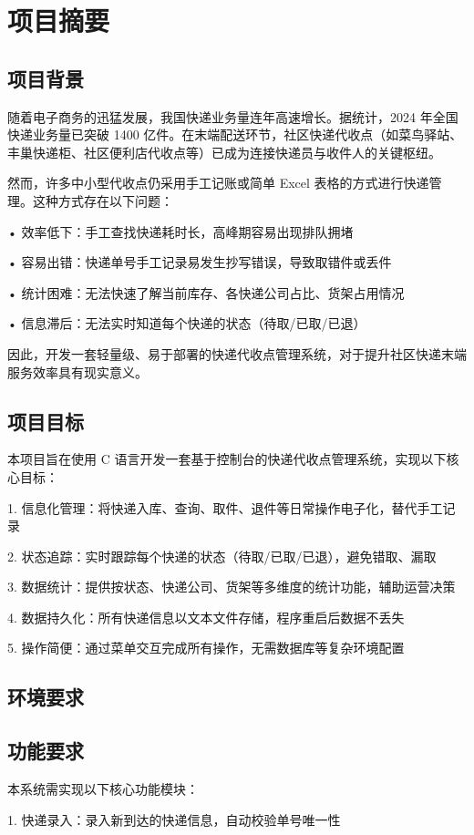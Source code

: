 \section{项目摘要}
\subsection{项目背景}
随着电子商务的迅猛发展，我国快递业务量连年高速增长。据统计，2024 年全国快递业务量已突破 1400 亿件。在末端配送环节，社区快递代收点（如菜鸟驿站、丰巢快递柜、社区便利店代收点等）已成为连接快递员与收件人的关键枢纽。

然而，许多中小型代收点仍采用手工记账或简单 Excel 表格的方式进行快递管理。这种方式存在以下问题：

• 效率低下：手工查找快递耗时长，高峰期容易出现排队拥堵

• 容易出错：快递单号手工记录易发生抄写错误，导致取错件或丢件

• 统计困难：无法快速了解当前库存、各快递公司占比、货架占用情况

• 信息滞后：无法实时知道每个快递的状态（待取/已取/已退）

因此，开发一套轻量级、易于部署的快递代收点管理系统，对于提升社区快递末端服务效率具有现实意义。

\subsection{项目目标}
本项目旨在使用 C 语言开发一套基于控制台的快递代收点管理系统，实现以下核心目标：

1. 信息化管理：将快递入库、查询、取件、退件等日常操作电子化，替代手工记录

2. 状态追踪：实时跟踪每个快递的状态（待取/已取/已退），避免错取、漏取

3. 数据统计：提供按状态、快递公司、货架等多维度的统计功能，辅助运营决策

4. 数据持久化：所有快递信息以文本文件存储，程序重启后数据不丢失

5. 操作简便：通过菜单交互完成所有操作，无需数据库等复杂环境配置

\subsection{环境要求}
\subsection{功能要求}
本系统需实现以下核心功能模块：

1. 快递录入：录入新到达的快递信息，自动校验单号唯一性

